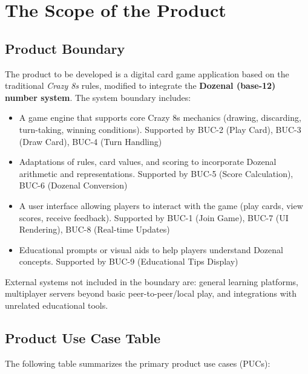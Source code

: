 \documentclass[12pt]{article}
\begin{document}
\section{The Scope of the Product}

\subsection{Product Boundary}
The product to be developed is a digital card game application based on the traditional \textit{Crazy 8s} rules, modified to integrate the \textbf{Dozenal (base-12) number system}.
The system boundary includes:
\begin{itemize}
    \item A game engine that supports core Crazy 8s mechanics (drawing, discarding, turn-taking, winning conditions). Supported by BUC-2 (Play Card), BUC-3 (Draw Card), BUC-4 (Turn Handling)
    \item Adaptations of rules, card values, and scoring to incorporate Dozenal arithmetic and representations. Supported by BUC-5 (Score Calculation), BUC-6 (Dozenal Conversion)
    \item A user interface allowing players to interact with the game (play cards, view scores, receive feedback). Supported by BUC-1 (Join Game), BUC-7 (UI Rendering), BUC-8 (Real-time Updates)
    \item Educational prompts or visual aids to help players understand Dozenal concepts. Supported by BUC-9 (Educational Tips Display)
\end{itemize}
External systems not included in the boundary are: general learning platforms, multiplayer servers beyond basic peer-to-peer/local play, and integrations with unrelated educational tools.

\subsection{Product Use Case Table}
The following table summarizes the primary product use cases (PUCs):
\end{document}

